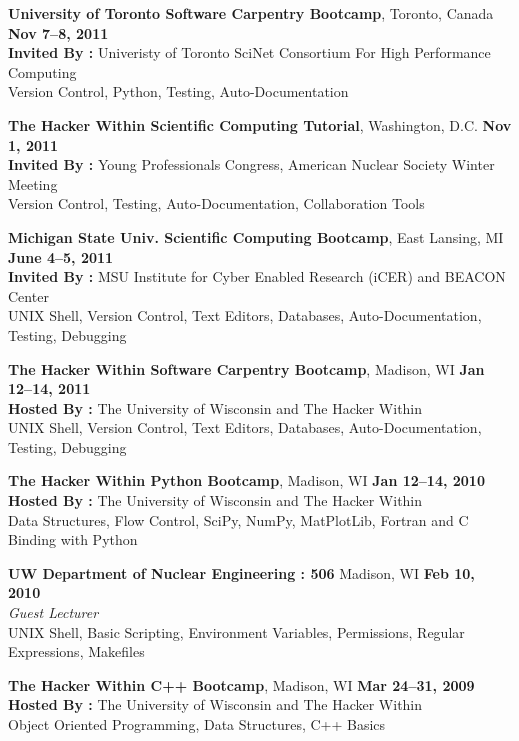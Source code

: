 \documentclass[margin,line]{resume}
\begin{document}
\begin{resume}
    \textbf{University of Toronto Software Carpentry Bootcamp}, Toronto, Canada \hfill \textbf{Nov 7--8, 2011}\\
               \textbf{Invited By : } Univeristy of Toronto SciNet Consortium For High Performance Computing\\
               Version Control, Python, Testing, Auto-Documentation

    \textbf{The Hacker Within Scientific Computing Tutorial}, Washington, D.C.  \hfill \textbf{Nov 1, 2011}\\
               \textbf{Invited By : } Young Professionals Congress, American Nuclear Society Winter Meeting\\
               Version Control, Testing, Auto-Documentation, Collaboration Tools

    \textbf{Michigan State Univ. Scientific Computing Bootcamp}, East Lansing, MI \hfill \textbf{June 4--5, 2011}\\
               \textbf{Invited By : } MSU Institute for Cyber Enabled Research (iCER) and BEACON Center\\
               UNIX Shell, Version Control, Text Editors, Databases, Auto-Documentation, Testing, Debugging

    \textbf{The Hacker Within Software Carpentry Bootcamp}, Madison, WI \hfill\textbf{Jan 12--14, 2011}\\
               \textbf{Hosted By : } The University of Wisconsin and The Hacker Within\\
               UNIX Shell, Version Control, Text Editors, Databases, Auto-Documentation, Testing, Debugging

    \textbf{The Hacker Within Python Bootcamp}, Madison, WI \hfill \textbf{Jan 12--14, 2010}\\
               \textbf{Hosted By : } The University of Wisconsin and The Hacker Within\\
               Data Structures, Flow Control, SciPy, NumPy, MatPlotLib, Fortran and C Binding with Python

    \textbf{UW Department of Nuclear Engineering : 506} Madison, WI \hfill \textbf{Feb 10, 2010}\\ 
               \textsl{Guest Lecturer}\\
               UNIX Shell, Basic Scripting, Environment Variables, Permissions, 
               Regular Expressions, Makefiles 

    \textbf{The Hacker Within C++ Bootcamp}, Madison, WI \hfill \textbf{Mar 24--31, 2009}\\
               \textbf{Hosted By : } The University of Wisconsin and The Hacker Within\\
               Object Oriented Programming, Data Structures, C++ Basics


\end{resume}
\end{document}
